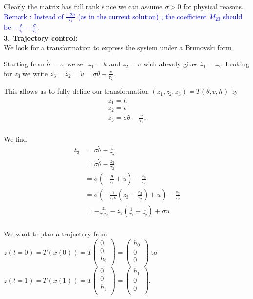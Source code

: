 Clearly the matrix has full rank since we can assume $\sigma>0$ for physical reasons.
\textcolor{blue}{Remark : Instead of $\frac{-2\sigma}{\tau_{1}}$ (as in the current solution) , the coefficient $M_{23}$ should be $-\frac{\sigma}{\tau_{1}}-\frac{\sigma}{\tau_{2}}$}.\\


\textbf{3. Trajectory control:}\\

We look for a transformation to express the system under a Brunovski form. 



Starting from $\dot{h}=v$, we set $z_{1}=h$ and $z_{2}=v$ wich already gives $\dot{z_{1}}=z_{2}$. Looking for $z_{3}$ we write $z_{3}=\dot{z_{2}}=\dot{v}=\sigma\theta-\frac{v}{\tau_{2}}$.



This allows us to fully define our transformation $(z_{1},z_{2},z_{3})=T(\theta,v,h)$ by
$$\begin{array}{lll}
z_{1}=h\\
z_{2}=v\\
z_{3}=\sigma\theta-\frac{v}{\tau_{2}}.\\
\end{array}$$

We find 
\begin{align*}
\dot{z_{3}}&=\sigma\dot{\theta}-\frac{\dot{v}}{\tau_{2}}\\
&=\sigma\dot{\theta}-\frac{z_{3}}{\tau_{2}}\\
&=\sigma(-\frac{\theta }{\tau_{1}}+u)-\frac{z_{3}}{\tau_{2}}\\
&=\sigma(-\frac{1}{\tau_{1}\sigma}(z_{3}+\frac{z_{2}}{\tau_{2}})+u)-\frac{z_{3}}{\tau_{2}}\\
&=-\frac{z_{2}}{\tau_{1}\tau_{2}}-z_{3}(\frac{1}{\tau_{1}}+\frac{1}{\tau_{2}})+\sigma u\\
\end{align*}

We want to plan a trajectory from $z(t=0)=T(x(0))=T\begin{pmatrix}
0\\
0\\
h_{0}\\
\end{pmatrix}=\begin{pmatrix}
h_{0}\\
0\\
0\\
\end{pmatrix}$ to $z(t=1)=T(x(1))=T\begin{pmatrix}
0\\
0\\
h_{1}\\
\end{pmatrix}=\begin{pmatrix}
h_{1}\\
0\\
0\\
\end{pmatrix}.$

